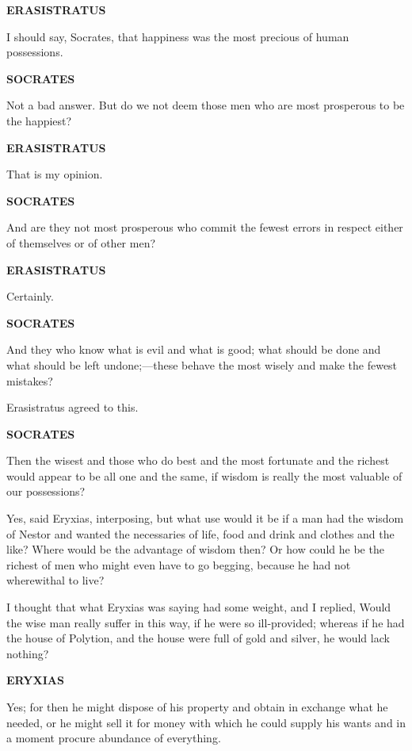 \documentclass[11pt,letter]{article}
\begin{document}
\par \textbf{ERASISTRATUS}
\par   I should say, Socrates, that happiness was the most precious of human possessions.

\par \textbf{SOCRATES}
\par   Not a bad answer. But do we not deem those men who are most prosperous to be the happiest?

\par \textbf{ERASISTRATUS}
\par   That is my opinion.

\par \textbf{SOCRATES}
\par   And are they not most prosperous who commit the fewest errors in respect either of themselves or of other men?

\par \textbf{ERASISTRATUS}
\par   Certainly.

\par \textbf{SOCRATES}
\par   And they who know what is evil and what is good; what should be done and what should be left undone;—these behave the most wisely and make the fewest mistakes?

\par  Erasistratus agreed to this.

\par \textbf{SOCRATES}
\par   Then the wisest and those who do best and the most fortunate and the richest would appear to be all one and the same, if wisdom is really the most valuable of our possessions?

\par  Yes, said Eryxias, interposing, but what use would it be if a man had the wisdom of Nestor and wanted the necessaries of life, food and drink and clothes and the like? Where would be the advantage of wisdom then? Or how could he be the richest of men who might even have to go begging, because he had not wherewithal to live?

\par  I thought that what Eryxias was saying had some weight, and I replied, Would the wise man really suffer in this way, if he were so ill-provided; whereas if he had the house of Polytion, and the house were full of gold and silver, he would lack nothing?

\par \textbf{ERYXIAS}
\par   Yes; for then he might dispose of his property and obtain in exchange what he needed, or he might sell it for money with which he could supply his wants and in a moment procure abundance of everything.
\end{document}
